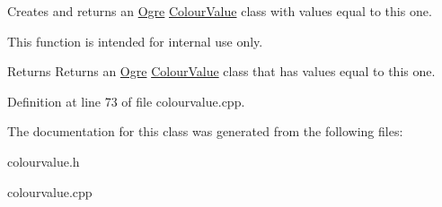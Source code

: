 Creates and returns an \hyperlink{namespaceOgre}{Ogre} \hyperlink{classphys_1_1ColourValue}{ColourValue} class with values equal to this one. 

This function is intended for internal use only. \begin{DoxyReturn}{Returns}
Returns an \hyperlink{namespaceOgre}{Ogre} \hyperlink{classphys_1_1ColourValue}{ColourValue} class that has values equal to this one. 
\end{DoxyReturn}


Definition at line 73 of file colourvalue.cpp.



The documentation for this class was generated from the following files:\begin{DoxyCompactItemize}
\item 
colourvalue.h\item 
colourvalue.cpp\end{DoxyCompactItemize}

